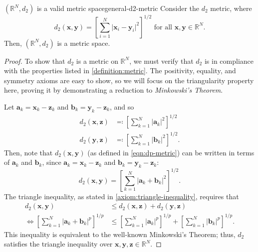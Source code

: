 \documentclass{article}
\renewcommand*\vec{\mathbf}
\numberwithin{equation}{section}
\numberwithin{figure}{section}
\begin{document}
\begin{theorem}{\texorpdfstring{$(\mathbb{R}^N,d_2)$}{Euclidean metric on an N-dimensional real vector space} is a valid metric space}{general-d2-metric}
    Consider the $ d_2 $ metric, where
    \begin{equation}
        d_2(\vec{x}, \vec{y}) = \left[\sum_{i=1}^N \vert \vec{x}_i -
        \vec{y}_i \vert^2\right]^{1/2} \label{eqn:dp-metric} \text { for all }
        \vec{x}, \vec{y} \in \mathbb{R}^N.
    \end{equation}
    Then, $ (\mathbb{R}^N, d_2) $ is a metric space.
    \begin{proof}
        To show that $ d_2 $ is a metric on $ \mathbb{R}^N $, we must verify
        that $ d_2 $ is in compliance with the properties listed in
        \cref{definition:metric}. The positivity, equality, and symmetry axioms
        are easy to show, so we will focus on the triangularity property here,
        proving it by demonstrating a reduction to \emph{Minkowski's Theorem}.

        Let $ \vec{a}_k = \vec{x}_k-\vec{z}_k$ and $ \vec{b}_k = \vec{y}_k-\vec{z}_k$, and so
        \begin{align}
            d_2(\vec{x}, \vec{z}) &\eqcolon \left[\sum_{k=1}^N \vert \vec{a}_k
                \vert^2\right]^{1/2} \\
            d_2(\vec{y}, \vec{z}) &\eqcolon \left[\sum_{k=1}^N \vert \vec{b}_k
                \vert^2\right]^{1/2}.
        \end{align}
        Then, note that $ d_2(\vec{x}, \vec{y}) $ (as defined in
        \cref{eqn:dp-metric}) can be
        written in terms of $ \vec{a}_k $ and $ \vec{b}_k $, since $ \vec{a}_k =
        \vec{x}_k - \vec{z}_k $ and $ \vec{b}_k = \vec{y}_k - \vec{z}_k $:
        \begin{equation}
            d_2(\vec{x}, \vec{y}) = \left[\sum_{k=1}^N \vert \vec{a}_k +
            \vec{b}_k \vert^2\right]^{1/2}.
        \end{equation}
        The triangle inequality, as stated in \cref{axiom:triangle-inequality},
        requires that
        \begin{align}
            d_2(\vec{x}, \vec{y}) &\le d_2(\vec{x}, \vec{z}) + d_2(\vec{y}, \vec{z}) \\[0.8em]
            \iff \left[\sum_{k=1}^N \vert \vec{a}_k + \vec{b}_k \vert^p\right]^{1/p}
            &\leq \left[\sum_{k=1}^N \vert \vec{a}_k \vert^p\right]^{1/p} +
            \left[\sum_{k=1}^N \vert \vec{b}_k \vert^p\right]^{1/p}.
        \end{align}
        This inequality is equivalent to the well-known Minkowski's Theorem;
        thus, $ d_2 $ satisfies the triangle inequality over $ \vec{x}, \vec{y},
        \vec{z} \in \mathbb{R}^N $.
    \end{proof}
\end{theorem}
\pagebreak
\end{document}
